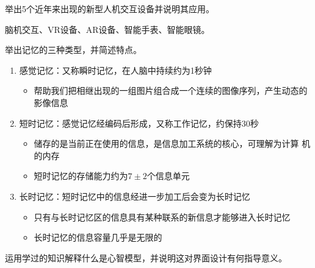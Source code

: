 \begin{problem}[2015]
举出5个近年来出现的新型人机交互设备并说明其应用。
\end{problem}

\begin{solution}
脑机交互、VR设备、AR设备、智能手表、智能眼镜。
\end{solution}



\begin{problem}[2015、2023]
举出记忆的三种类型，并简述特点。
\end{problem}

\begin{solution}
\begin{enumerate}[label=\arabic*.]
    \item 感觉记忆：又称瞬时记忆，在人脑中持续约为1秒钟
    \vspace{-0.25em}
    \begin{itemize}
        \item 帮助我们把相继出现的一组图片组合成一个连续的图像序列，产生动态的影像信息
    \end{itemize}
    \item 短时记忆：感觉记忆经编码后形成，又称工作记忆，约保持30秒
    \vspace{-0.25em}
    \begin{itemize}
        \item 储存的是当前正在使用的信息，是信息加工系统的核心，可理解为计算
        机的内存
        \item 短时记忆的存储能力约为$7 \pm 2$个信息单元
    \end{itemize}
    \item 长时记忆：短时记忆中的信息经进一步加工后会变为长时记忆
    \vspace{-0.25em}
    \begin{itemize}
        \item 只有与长时记忆区的信息具有某种联系的新信息才能够进入长时记忆
        \item 长时记忆的信息容量几乎是无限的
    \end{itemize}
\end{enumerate}
\end{solution}



\begin{problem}[2015、2016、2021、2023]
运用学过的知识解释什么是心智模型，并说明这对界面设计有何指导意义。
\end{problem}

